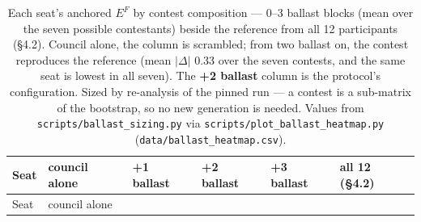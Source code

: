 \begin{longtable}[]{@{}
  >{\raggedright\arraybackslash}p{}
  >{\raggedleft\arraybackslash}p{}
  >{\raggedleft\arraybackslash}p{}
  >{\raggedleft\arraybackslash}p{}
  >{\raggedleft\arraybackslash}p{}
  >{\raggedleft\arraybackslash}p{}@{}}
\caption{Each seat's anchored \(E^{F}\) by contest composition --- 0--3 ballast blocks (mean over the seven possible contestants) beside the reference from all 12 participants (§4.2). Council alone, the column is scrambled; from two ballast on, the contest reproduces the reference (mean \(|\Delta|\) 0.33 over the seven contests, and the same seat is lowest in all seven). The \textbf{+2 ballast} column is the protocol's configuration. Sized by re-analysis of the pinned run --- a contest is a sub-matrix of the bootstrap, so no new generation is needed. Values from \protect\texttt{scripts/ballast\_sizing.py} via \protect\texttt{scripts/plot\_ballast\_heatmap.py} (\protect\texttt{data/ballast\_heatmap.csv}).}\tabularnewline
\toprule\noalign{}
\begin{minipage}[b]{\linewidth}\raggedright
Seat
\end{minipage} & \begin{minipage}[b]{\linewidth}\raggedleft
council alone
\end{minipage} & \begin{minipage}[b]{\linewidth}\raggedleft
+1 ballast
\end{minipage} & \begin{minipage}[b]{\linewidth}\raggedleft
+2 ballast
\end{minipage} & \begin{minipage}[b]{\linewidth}\raggedleft
+3 ballast
\end{minipage} & \begin{minipage}[b]{\linewidth}\raggedleft
all 12 (§4.2)
\end{minipage} \\
\midrule\noalign{}
\endfirsthead
\toprule\noalign{}
\begin{minipage}[b]{\linewidth}\raggedright
Seat
\end{minipage} & \begin{minipage}[b]{\linewidth}\raggedleft
council alone
\end{minipage} & \begin{minipage}[b]{\linewidth}\raggedleft

\end{minipage}
\end{longtable}
